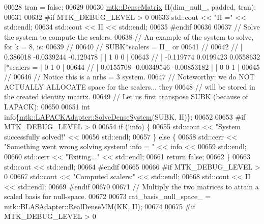 \begin{DoxyCode}
{{00628   tran = \textcolor{keyword}{false};
00629 
00630   \hyperlink{classmtk_1_1DenseMatrix}{mtk::DenseMatrix} II(dim\_null\_, padded, tran);
00631 
00632 \textcolor{preprocessor}{  #if MTK\_DEBUG\_LEVEL > 0}
00633   std::cout << \textcolor{stringliteral}{"II ="} << std::endl;
00634   std::cout << II << std::endl;
00635 \textcolor{preprocessor}{  #endif}
00636 
00637   \textcolor{comment}{// Solve the system to compute the scalers.}
00638   \textcolor{comment}{// An example of the system to solve, for k = 8, is:}
00639   \textcolor{comment}{//}
00640   \textcolor{comment}{// SUBK*scalers = II\_ or}
00641   \textcolor{comment}{//}
00642   \textcolor{comment}{// |  0.386018  -0.0339244   -0.129478 |           | 1 0 0 |}
00643   \textcolor{comment}{// | -0.119774   0.0199423   0.0558632 |*scalers = | 0 1 0 |}
00644   \textcolor{comment}{// | 0.0155708 -0.00349546 -0.00853182 |           | 0 0 1 |}
00645   \textcolor{comment}{//}
00646   \textcolor{comment}{// Notice this is a nrhs = 3 system.}
00647   \textcolor{comment}{// Noteworthy: we do NOT ACTUALLY ALLOCATE space for the scalers... they}
00648   \textcolor{comment}{// will be stored in the created identity matrix.}
00649   \textcolor{comment}{// Let us first transpose SUBK (because of LAPACK):}
00650 
00651   \textcolor{keywordtype}{int} info\{\hyperlink{classmtk_1_1LAPACKAdapter_a7428bccf74fd4a4af68fb7233846da22}{mtk::LAPACKAdapter::SolveDenseSystem}(SUBK, II)\};
00652 
00653 \textcolor{preprocessor}{  #if MTK\_DEBUG\_LEVEL > 0}
00654   \textcolor{keywordflow}{if} (!info) \{
00655     std::cout << \textcolor{stringliteral}{"System successfully solved!"} <<
00656       std::endl;
00657   \} \textcolor{keywordflow}{else} \{
00658     std::cerr << \textcolor{stringliteral}{"Something went wrong solving system! info = "} << info <<
00659       std::endl;
00660     std::cerr << \textcolor{stringliteral}{"Exiting..."} << std::endl;
00661     \textcolor{keywordflow}{return} \textcolor{keyword}{false};
00662   \}
00663   std::cout << std::endl;
00664 \textcolor{preprocessor}{  #endif}
00665 
00666 \textcolor{preprocessor}{  #if MTK\_DEBUG\_LEVEL > 0}
00667   std::cout << \textcolor{stringliteral}{"Computed scalers:"} << std::endl;
00668   std::cout << II << std::endl;
00669 \textcolor{preprocessor}{  #endif}
00670 
00671   \textcolor{comment}{// Multiply the two matrices to attain a scaled basis for null-space.}
00672 
00673   rat\_basis\_null\_space\_ = \hyperlink{classmtk_1_1BLASAdapter_acebd0e9bfe0bdd609c7fbea98ccfd3b5}{mtk::BLASAdapter::RealDenseMM}(KK, II);
00674 
00675 \textcolor{preprocessor}{  #if MTK\_DEBUG\_LEVEL > 0}
}}
\end{DoxyCode}
